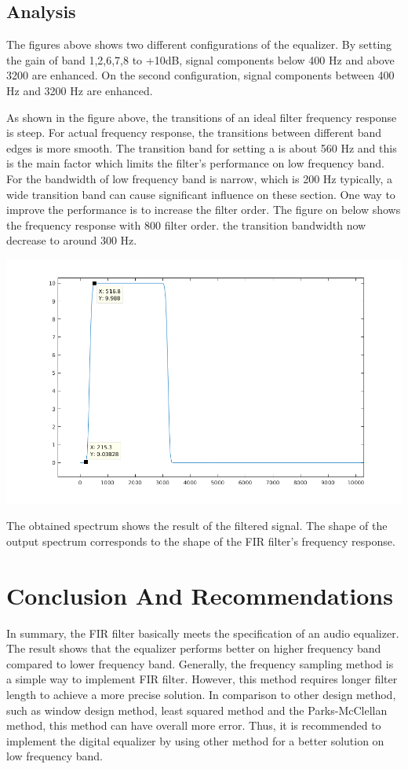 \documentclass[titlepage]{article}
\begin{document}
\subsection{Analysis}
\label{sec:orgea43428}
The figures above shows two different configurations of the equalizer. By
setting the gain of band 1,2,6,7,8 to +10dB, signal components below 400 Hz
and above 3200 are enhanced. On the second configuration, signal components
between 400 Hz and 3200 Hz are enhanced. 

As shown in the figure above, the transitions of an ideal filter frequency
response is steep. For actual frequency response, the transitions between
different band edges is more smooth. The transition band for setting a is
about 560 Hz and this is the main factor which limits the filter's
performance on low frequency band. For the bandwidth of low frequency band is
narrow, which is 200 Hz typically, a wide transition band can cause
significant influence on these section. One way to improve the performance is
to increase the filter order. The figure on below shows the frequency
response with 800 filter order.  the transition bandwidth now
decrease to around 300 Hz.

\begin{center}
\includegraphics[width=.9\linewidth]{higher_order.png}
\end{center}

The obtained spectrum shows the result of the filtered signal. The shape of
the output spectrum corresponds to the shape of the FIR filter's frequency
response. 
\section{Conclusion And Recommendations}
\label{sec:orgbceac71}
In summary, the FIR filter basically meets the specification of an audio
equalizer. The result shows that the equalizer performs better on higher
frequency band compared to lower frequency band. Generally, the frequency
sampling method is a simple way to implement FIR filter. However, this method
requires longer filter length to achieve a more precise solution. In
comparison to other design method, such as window design method, least squared
method and the Parks-McClellan method, this method can have overall more
error. Thus, it is recommended to implement the digital equalizer by using
other method for a better solution on low frequency band.
\end{document}
